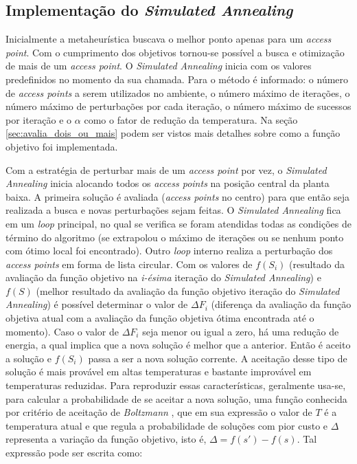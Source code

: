\documentclass[
	12pt,				%
	twoside,			%
	a4paper,			%
	english,			%
	french,				%
	spanish,			%
	brazil				%
	]{abntex2}
\begin{document}
\subsection{\texorpdfstring{Implementação do \emph{Simulated
Annealing}}{Implementação do Simulated Annealing}}\label{implementauxe7uxe3o-do-simulated-annealing}

Inicialmente a metaheurística buscava o melhor ponto apenas para um
\emph{access point}. Com o cumprimento dos objetivos tornou-se possível
a busca e otimização de mais de um \emph{access point}. O
\emph{Simulated Annealing} inicia com os valores predefinidos no momento
da sua chamada. Para o método é informado: o número de \emph{access
points} a serem utilizados no ambiente, o número máximo de iterações, o
número máximo de perturbações por cada iteração, o número máximo de
sucessos por iteração e o \(\alpha\) como o fator de redução da
temperatura. Na seção \ref{sec:avalia_dois_ou_mais} podem ser vistos
mais detalhes sobre como a função objetivo foi implementada.

Com a estratégia de perturbar mais de um \emph{access point} por vez, o
\emph{Simulated Annealing} inicia alocando todos os \emph{access points}
na posição central da planta baixa. A primeira solução é avaliada
(\emph{access points} no centro) para que então seja realizada a busca e
novas perturbações sejam feitas. O \emph{Simulated Annealing} fica em um
\emph{loop} principal, no qual se verifica se foram atendidas todas as
condições de término do algoritmo (se extrapolou o máximo de iterações
ou se nenhum ponto com ótimo local foi encontrado). Outro \emph{loop}
interno realiza a perturbação dos \emph{access points} em forma de lista
circular. Com os valores de \(f(S_{i})\) (resultado da avaliação da
função objetivo na \emph{i-ésima} iteração do \emph{Simulated
Annealing}) e \(f(S)\) (melhor resultado da avaliação da função objetivo
iteração do \emph{Simulated Annealing}) é possível determinar o valor de
\(\Delta F_{i}\) (diferença da avaliação da função objetiva atual com a
avaliação da função objetiva ótima encontrada até o momento). Caso o
valor de \(\Delta F_{i}\) seja menor ou igual a zero, há uma redução de
energia, a qual implica que a nova solução é melhor que a anterior.
Então é aceito a solução e \(f(S_{i})\) passa a ser a nova solução
corrente. A aceitação desse tipo de solução é mais provável em altas
temperaturas e bastante improvável em temperaturas reduzidas. Para
reproduzir essas características, geralmente usa-se, para calcular a
probabilidade de se aceitar a nova solução, uma função conhecida por
critério de aceitação de \emph{Boltzmann} \cite{AARTS}, que em sua
expressão o valor de \(T\) é a temperatura atual e que regula a
probabilidade de soluções com pior custo e \(\Delta\) representa a
variação da função objetivo, isto é, \(\Delta = f(s') - f(s)\). Tal
expressão pode ser escrita como:
\end{document}
